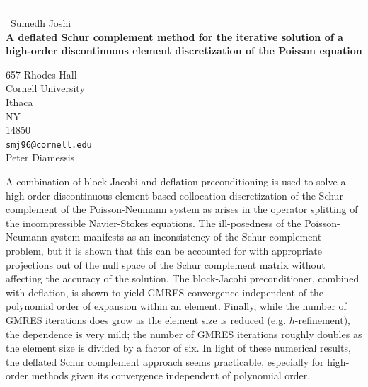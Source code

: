 \documentclass{report}
\begin{document}
\begin{center}
\rule{6in}{1pt} \
{\large Sumedh Joshi \\
{\bf A deflated Schur complement method for the iterative solution of a high-order discontinuous element discretization of the Poisson equation}}

657 Rhodes Hall \\ Cornell University \\ Ithaca \\ NY \\ 14850
\\
{\tt smj96@cornell.edu}\\
Peter Diamessis\end{center}

A combination of block-Jacobi and deflation preconditioning is used to
solve a high-order discontinuous element-based collocation discretization
of the Schur complement of the Poisson-Neumann system as arises in the
operator splitting of the incompressible Navier-Stokes equations.
The ill-posedness of the Poisson-Neumann system manifests as an
inconsistency of the Schur complement problem, but it is shown that this
can be accounted for with appropriate projections out of the null space
of the Schur complement matrix without affecting the accuracy of the
solution. The block-Jacobi preconditioner, combined with deflation, is
shown to yield GMRES convergence independent of the polynomial order of
expansion within an element. Finally, while the number of GMRES
iterations does grow as the element size is reduced (e.g.
$h$-refinement), the dependence is very mild; the number of GMRES
iterations roughly doubles as the element size is divided by a factor of
six. In light of these numerical results, the deflated Schur complement
approach seems practicable, especially for high-order methods given its
convergence independent of polynomial order.
\end{document}
